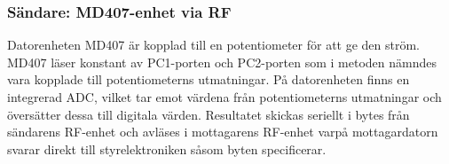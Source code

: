 \documentclass[a4paper]{article}
\begin{document}
\subsubsection{Sändare: MD407-enhet via RF}
Datorenheten MD407 är kopplad till en potentiometer för att ge den ström. MD407 läser konstant av PC1-porten och PC2-porten som i metoden nämndes vara kopplade till potentiometerns utmatningar. På datorenheten finns en integrerad ADC, vilket tar emot värdena från potentiometerns utmatningar och översätter dessa till digitala värden. Resultatet skickas seriellt i bytes från sändarens RF-enhet och avläses i mottagarens RF-enhet varpå mottagardatorn svarar direkt till styrelektroniken såsom byten specificerar.


\end{document}
